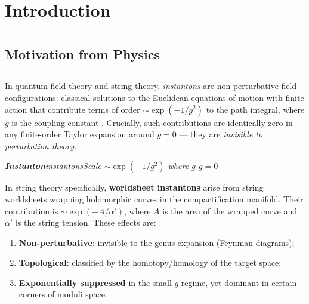 \documentclass[11pt,a4paper]{article}
\theoremstyle{plain}
\theoremstyle{definition}
\begin{document}
\tableofcontents

\section{Introduction}
\section*{}

\subsection{Motivation from Physics}
\subsection*{}

In quantum field theory and string theory, \emph{instantons} are non-perturbative 
field configurations: classical solutions to the Euclidean equations of motion 
with finite action that contribute terms of order $\sim \exp(-1/g^2)$ to the 
path integral, where $g$ is the coupling constant \cite{coleman1977, polyakov1977}. 
Crucially, such contributions are identically zero in any finite-order Taylor 
expansion around $g=0$ — they are \emph{invisible to perturbation theory}.

\bigskip
\noindent
\textit{\textbf{Instanton}instantonsScale $\sim \exp(-1/g^2)$ where $g$  $g=0$ ——\textbf{}}

In string theory specifically, \textbf{worldsheet instantons} arise from string 
worldsheets wrapping holomorphic curves in the compactification manifold. Their 
contribution is $\sim \exp(-A/\alpha')$, where $A$ is the area of the wrapped 
curve and $\alpha'$ is the string tension. These effects are:
\begin{enumerate}[label=(\roman*)]
  \item \textbf{Non-perturbative}: invisible to the genus expansion (Feynman diagrams);
  \item \textbf{Topological}: classified by the homotopy/homology of the target space;
  \item \textbf{Exponentially suppressed} in the small-$g$ regime, yet dominant 
        in certain corners of moduli space.
\end{enumerate}
\end{document}
